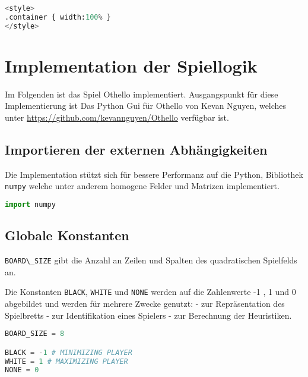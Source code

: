 \begin{lstlisting}[language=Python]
%%HTML
<style>
.container { width:100% }
</style>
\end{lstlisting}

\hypertarget{implementation-der-spiellogik}{%
\section{Implementation der
Spiellogik}\label{implementation-der-spiellogik}}

Im Folgenden ist das Spiel Othello implementiert. Ausgangspunkt für
diese Implementierung ist Das Python Gui für Othello von Kevan Nguyen,
welches unter \url{https://github.com/kevannguyen/Othello} verfügbar
ist.

\hypertarget{importieren-der-externen-abhuxe4ngigkeiten}{%
\subsection{Importieren der externen
Abhängigkeiten}\label{importieren-der-externen-abhuxe4ngigkeiten}}

Die Implementation stützt sich für bessere Performanz auf die Python,
Bibliothek \passthrough{\lstinline!numpy!} welche unter anderem homogene
Felder und Matrizen implementiert.

\begin{lstlisting}[language=Python]
import numpy
\end{lstlisting}

\hypertarget{globale-konstanten}{%
\subsection{Globale Konstanten}\label{globale-konstanten}}

\passthrough{\lstinline!BOARD\_SIZE!} gibt die Anzahl an Zeilen und
Spalten des quadratischen Spielfelds an.

Die Konstanten \passthrough{\lstinline!BLACK!},
\passthrough{\lstinline!WHITE!} und \passthrough{\lstinline!NONE!}
werden auf die Zahlenwerte -1 , 1 und 0 abgebildet und werden für
mehrere Zwecke genutzt: - zur Repräsentation des Spielbretts - zur
Identifikation eines Spielers - zur Berechnung der Heuristiken.

\begin{lstlisting}[language=Python]
BOARD_SIZE = 8

BLACK = -1 # MINIMIZING PLAYER
WHITE = 1 # MAXIMIZING PLAYER
NONE = 0
\end{lstlisting}

